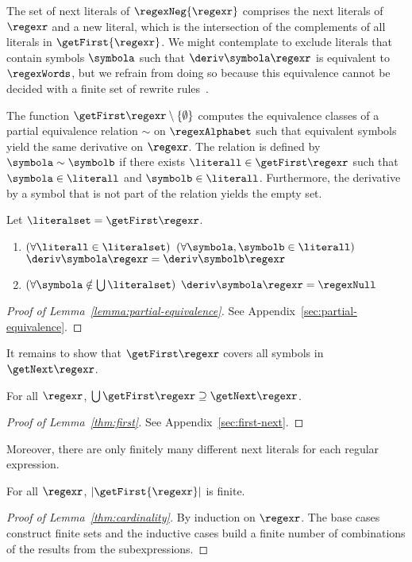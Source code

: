 The set of next literals of $\regexNeg{\regexr}$ comprises the next
literals of $\regexr$ and a new literal, which is the intersection of
the complements of all literals in $\getFirst{\regexr}$.
We might contemplate to exclude literals that contain symbols
$\symbola$ such that $\deriv\symbola\regexr$ is equivalent to
$\regexWords$, but we refrain from doing so because this equivalence
cannot be decided with a finite set of rewrite
rules~\cite{Redko1964}. 

The function $\getFirst\regexr \setminus \{\emptyset\}$ computes the
equivalence classes of a partial equivalence relation $\sim$ on
$\regexAlphabet$ such that equivalent symbols yield the same
derivative on $\regexr$. The relation is defined by $\symbola \sim \symbolb$ if there exists
$\literall\in\getFirst\regexr$ such that $\symbola\in\literall$ and
$\symbolb\in\literall$. Furthermore, the derivative by a symbol that is not part of the 
relation yields the empty set.
\begin{lemma}\label{lemma:partial-equivalence}
  Let $\literalset = \getFirst\regexr$.
  \begin{enumerate}
    \item\label{item:1} $(\forall \literall\in\literalset)$ $(\forall \symbola,\symbolb\in \literall)$
      $\deriv\symbola\regexr = \deriv\symbolb\regexr$
    \item $(\forall \symbola\notin \bigcup \literalset)$
      $\deriv\symbola\regexr = \regexNull$
  \end{enumerate}
\end{lemma}
\begin{proof}[Proof of Lemma~\ref{lemma:partial-equivalence}]
  See Appendix~\ref{sec:partial-equivalence}.
\end{proof}
It remains to show that $\getFirst\regexr$ covers all symbols in
$\getNext\regexr$.
\begin{lemma}[First]\label{thm:first}
  For all $\regexr$,
  $\bigcup \getFirst\regexr \supseteq \getNext\regexr$.
\end{lemma}
\begin{proof}[Proof of Lemma~\ref{thm:first}]
  See Appendix~\ref{sec:first-next}.
\end{proof}
Moreover, there are only finitely many different next literals for each regular
expression. 
\begin{lemma}[Finiteness]\label{thm:cardinality}
  For all $\regexr$,
  $|\getFirst{\regexr}|$ is finite.
\end{lemma}
\begin{proof}[Proof of Lemma~\ref{thm:cardinality}]
  By induction on $\regexr$. The base cases construct finite sets and the inductive cases build a
  finite number of combinations of the results from the subexpressions.
\end{proof}
